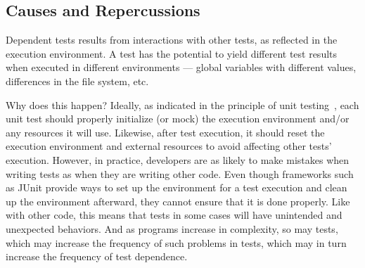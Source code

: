 \subsection{Causes and Repercussions}
\label{sec:intro-repercussions}


Dependent tests results from interactions with other tests,
as reflected in the execution environment.
A test has the potential to yield
different test results when executed in different environments
--- global variables with different values, differences in the file system, etc.

Why does this happen? Ideally, as
indicated in the principle of unit testing~\cite{Greiler:2013:SAT, Massol:2003}, each unit
test should properly initialize (or mock) the execution environment
and/or any resources it will use.
Likewise, after test execution, it should reset the
execution environment and external resources
to avoid affecting other tests' execution.
However, in practice,
developers are as likely
to make mistakes when writing tests as when they are writing other code.
Even though frameworks such as
JUnit provide ways to set up the environment for a test execution and clean
up the environment afterward,
they cannot ensure that it is done
properly. Like with other code, this means that tests in some
cases will have unintended and unexpected behaviors. And
as programs increase in complexity, so may tests, which may
increase the frequency of such problems in tests, which may
in turn increase the frequency of test dependence.



%
%




